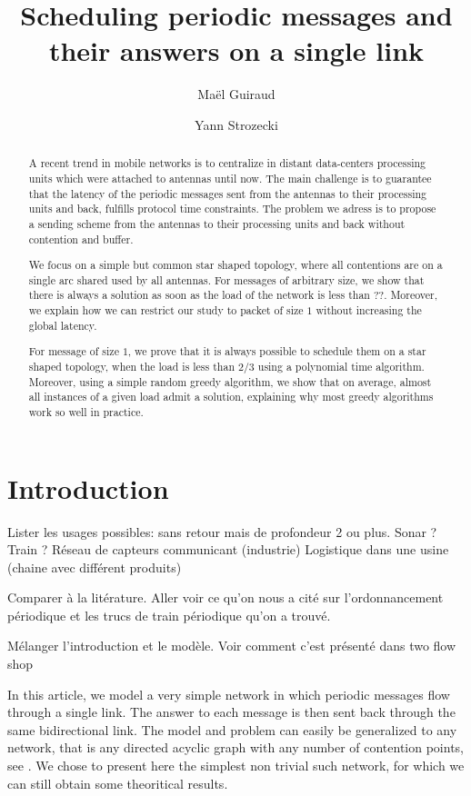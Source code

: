 \documentclass[10pt, conference, letterpaper]{IEEEtran}
\title{Scheduling periodic messages and their answers on a single link}
\author[1,2]{Ma\"el Guiraud}
\author[1]{Yann Strozecki}
\affil[1]{David Laboratory, UVSQ}
\affil[2]{Nokia Bell Labs France}
\begin{document}
\maketitle

\begin{abstract}

A recent trend in mobile networks is to centralize in distant data-centers processing units which were attached to antennas until now. The main challenge is to guarantee that the latency of the periodic messages sent from the antennas to their processing units and back, fulfills protocol time constraints. The problem we adress is to propose a sending scheme from the antennas to their processing units and back without contention and buffer.

We focus on a simple but common star shaped topology, where all contentions are on a single arc shared used by all antennas. For messages of arbitrary size, we show that there is always a solution as soon as the load of the network is less than $ ?? $. Moreover, we explain how we can restrict our study to packet of size $1$ without increasing the global latency. 

For message of size $1$, we prove that it is always possible to schedule them on a star shaped topology, when the load is less than $2/3$ using a polynomial time algorithm.
Moreover, using a simple random greedy algorithm, we show that on average, almost all
instances of a given load admit a solution, explaining why most greedy algorithms work so well in practice.  
\end{abstract}


\section{Introduction}

Lister les usages possibles: 
sans retour mais de profondeur 2 ou plus. Sonar ? Train ?
Réseau de capteurs communicant (industrie)
Logistique dans une usine (chaine avec différent produits)

Comparer à la litérature. Aller voir ce qu'on nous a cité sur l'ordonnancement périodique 
et les trucs de train périodique qu'on a trouvé.



Mélanger l'introduction et le modèle. Voir comment c'est présenté dans two flow shop

In this article, we model a very simple network in which periodic messages flow through a single link. The answer to each message is then sent back through the same bidirectional link. The model and problem can easily be generalized to any network, that is any directed acyclic graph with any number of contention points, see \cite{dominique2018deterministic}. We chose to present here the simplest non trivial such network, 
 for which we can still obtain some theoritical results. 
\end{document}
